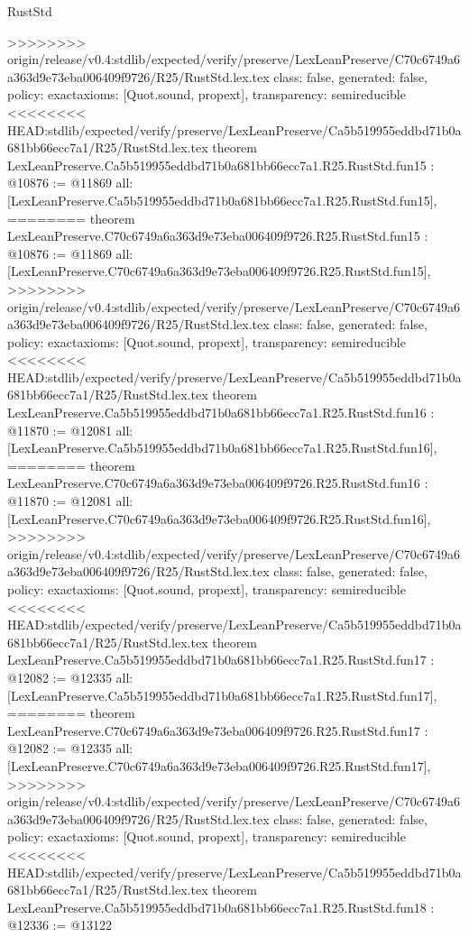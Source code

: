 \begin{lexlean}{RustStd}
\begin{coremodule}
{\begin{coremodule}
{{{{{{{{{{{{{{{{{{>>>>>>>> origin/release/v0.4:stdlib/expected/verify/preserve/LexLeanPreserve/C70c6749a6a363d9e73eba006409f9726/R25/RustStd.lex.tex
  class: false,
  generated: false,
  policy: exact{axioms: [Quot.sound, propext]},
  transparency: semireducible
}
<<<<<<<< HEAD:stdlib/expected/verify/preserve/LexLeanPreserve/Ca5b519955eddbd71b0a681bb66ecc7a1/R25/RustStd.lex.tex
theorem LexLeanPreserve.Ca5b519955eddbd71b0a681bb66ecc7a1.R25.RustStd.fun15 : @10876 := @11869 {
  all: [LexLeanPreserve.Ca5b519955eddbd71b0a681bb66ecc7a1.R25.RustStd.fun15],
========
theorem LexLeanPreserve.C70c6749a6a363d9e73eba006409f9726.R25.RustStd.fun15 : @10876 := @11869 {
  all: [LexLeanPreserve.C70c6749a6a363d9e73eba006409f9726.R25.RustStd.fun15],
>>>>>>>> origin/release/v0.4:stdlib/expected/verify/preserve/LexLeanPreserve/C70c6749a6a363d9e73eba006409f9726/R25/RustStd.lex.tex
  class: false,
  generated: false,
  policy: exact{axioms: [Quot.sound, propext]},
  transparency: semireducible
}
<<<<<<<< HEAD:stdlib/expected/verify/preserve/LexLeanPreserve/Ca5b519955eddbd71b0a681bb66ecc7a1/R25/RustStd.lex.tex
theorem LexLeanPreserve.Ca5b519955eddbd71b0a681bb66ecc7a1.R25.RustStd.fun16 : @11870 := @12081 {
  all: [LexLeanPreserve.Ca5b519955eddbd71b0a681bb66ecc7a1.R25.RustStd.fun16],
========
theorem LexLeanPreserve.C70c6749a6a363d9e73eba006409f9726.R25.RustStd.fun16 : @11870 := @12081 {
  all: [LexLeanPreserve.C70c6749a6a363d9e73eba006409f9726.R25.RustStd.fun16],
>>>>>>>> origin/release/v0.4:stdlib/expected/verify/preserve/LexLeanPreserve/C70c6749a6a363d9e73eba006409f9726/R25/RustStd.lex.tex
  class: false,
  generated: false,
  policy: exact{axioms: [Quot.sound, propext]},
  transparency: semireducible
}
<<<<<<<< HEAD:stdlib/expected/verify/preserve/LexLeanPreserve/Ca5b519955eddbd71b0a681bb66ecc7a1/R25/RustStd.lex.tex
theorem LexLeanPreserve.Ca5b519955eddbd71b0a681bb66ecc7a1.R25.RustStd.fun17 : @12082 := @12335 {
  all: [LexLeanPreserve.Ca5b519955eddbd71b0a681bb66ecc7a1.R25.RustStd.fun17],
========
theorem LexLeanPreserve.C70c6749a6a363d9e73eba006409f9726.R25.RustStd.fun17 : @12082 := @12335 {
  all: [LexLeanPreserve.C70c6749a6a363d9e73eba006409f9726.R25.RustStd.fun17],
>>>>>>>> origin/release/v0.4:stdlib/expected/verify/preserve/LexLeanPreserve/C70c6749a6a363d9e73eba006409f9726/R25/RustStd.lex.tex
  class: false,
  generated: false,
  policy: exact{axioms: [Quot.sound, propext]},
  transparency: semireducible
}
<<<<<<<< HEAD:stdlib/expected/verify/preserve/LexLeanPreserve/Ca5b519955eddbd71b0a681bb66ecc7a1/R25/RustStd.lex.tex
theorem LexLeanPreserve.Ca5b519955eddbd71b0a681bb66ecc7a1.R25.RustStd.fun18 : @12336 := @13122 {
}}}}}}}}}}}}}}}}}}}}}
\end{coremodule}}
\end{coremodule}
\end{lexlean}
